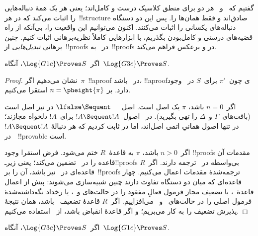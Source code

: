 \documentclass[../../../include/open-logic-section]{subfiles}
\begin{document}


گفتیم که~ و~ هر دو برای منطق کلاسیک درست و کامل‌اند؛
یعنی هر یک همهٔ دنباله‌هایی را اثبات می‌کند که در هر~!!{structure} صادق‌اند
و فقط همان‌ها را. پس این دو دستگاه دنباله‌های یکسانی را اثبات می‌کنند.
اکنون می‌توانیم این واقعیت را، بی‌آنکه از راه قضیه‌های درستی و کامل‌بودن
بگذریم، با ابزارهایی کاملاً نظریه‌برهانی اثبات کنیم. چنین برهانی
\emph{تبدیل‌هایی} از~!!{proof}s در~ به~!!{proof}s در
 و برعکس فراهم می‌کند.

\begin{prop}
اگر~$\Log{G1c}\Proves S$، آنگاه~$\Log{G3c}\Proves S$.
\end{prop}

\begin{proof}
  نشان می‌دهیم اگر~$\pi$~!!a{proof} در~ باشد، !!a{proof}ی
  چون~$\pi'$ برای~$S$ در~ وجود دارد. بر
  $n=\pheight{\pi}$ استقرا می‌کنیم.

  اگر~$n=0$ باشد، $\pi$ یک اصل است. اصل~$\lfalse\Sequent\quad$ در
   نیز اصل است (بافت‌های~$\Gamma$ و~$\Delta$ را تهی بگیرید).
  در~ اصول~$!A\Sequent !A$ برای~$!A$ دلخواه مجازند؛ در
   تنها اصول همانیِ اتمی اصل‌اند، اما در
   ثابت کردیم که هر دنبالهٔ
  $!A\Sequent !A$ در~~!!{provable} است.

  اگر~$n>0$ باشد، $\pi$ به قاعدهٔ~$R$ ختم می‌شود. فرض استقرا وجود
  !!{proof}s مقدمات آن قاعده را در~ تضمین می‌کند؛ یعنی
  زیرـ!!{proof}s بی‌واسطه در~ ترجمه دارند. اگر~$R$ قاعده‌ای
  در~ نیز باشد، آن را بر~!!{proof}s ترجمه‌شدهٔ مقدمات اعمال
  می‌کنیم. چهار
  قاعده‌ای که میان دو دستگاه تفاوت دارند چنین شبیه‌سازی می‌شوند: پیش از
  اعمال قاعدهٔ~، با تضعیف مجاز
   فرمول فعالِ مفقود را در حالت‌های
  \LeftR{\land} و~\RightR{\lor}، یا رخداد نگه‌داشته‌شدهٔ فرمول اصلی را
  در حالت‌های~\LeftR{\lforall} و~\RightR{\lexists} می‌افزاییم. اگر~$R$
  قاعدهٔ تضعیف~ باشد، همان نتیجهٔ پذیرش تضعیف را به کار می‌بریم؛
  و اگر قاعدهٔ انقباض باشد، از~ استفاده
  می‌کنیم.
\end{proof}

\begin{prop}
اگر~$\Log{G3c}\Proves S$، آنگاه~$\Log{G1c}\Proves S$.
\end{prop}
\end{document}
